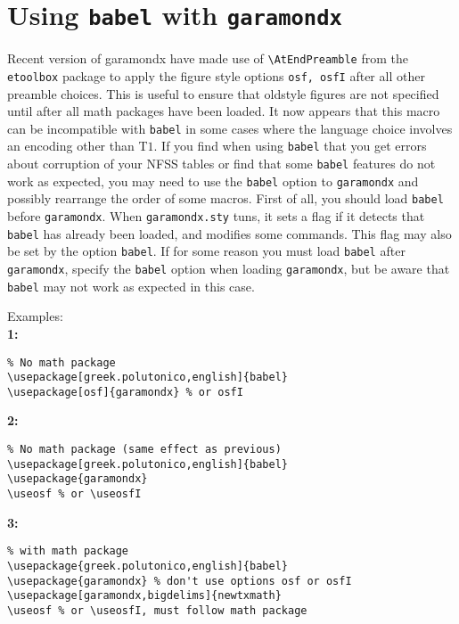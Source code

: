 \documentclass[11pt]{article}
\begin{document}
\section{Using \texttt{babel} with \texttt{garamondx}\label{sec:opt}}
Recent version of \textsf{garamondx} have made use of \verb|\AtEndPreamble| from the {\tt etoolbox} package to apply the  figure style options {\tt osf, osfI} after all other preamble choices. This is useful to ensure that oldstyle figures are not specified until after all math packages have been loaded. It now appears that this macro can be incompatible with {\tt babel} in some cases where the language choice involves an encoding other than T$1$. If you find when using {\tt babel} that you get errors about corruption of your NFSS tables or find that some \texttt{babel} features do not work as expected, you may need to use the {\tt babel} option to {\tt garamondx} and possibly rearrange the order of some macros. First of all, you should load \texttt{babel} before {\tt garamondx}. When {\tt garamondx.sty} tuns, it sets a flag if it detects that {\tt babel} has already been  loaded, and modifies some commands. This flag may also be set by the option {\tt babel}. If for some reason you must load {\tt babel} after {\tt garamondx}, specify the {\tt babel} option when loading {\tt garamondx}, but be aware that {\tt babel} may not work as expected in this case. 

Examples:\\
{\bf 1:}\\[-20pt]
\begin{verbatim}
% No math package
\usepackage[greek.polutonico,english]{babel}
\usepackage[osf]{garamondx} % or osfI
\end{verbatim}
{\bf 2:}\\[-20pt]
\begin{verbatim}
% No math package (same effect as previous)
\usepackage[greek.polutonico,english]{babel}
\usepackage{garamondx} 
\useosf % or \useosfI
\end{verbatim}
{\bf 3:}\\[-20pt]
\begin{verbatim}
% with math package
\usepackage{greek.polutonico,english]{babel}
\usepackage{garamondx} % don't use options osf or osfI
\usepackage[garamondx,bigdelims]{newtxmath}
\useosf % or \useosfI, must follow math package
\end{verbatim}
\end{document}
